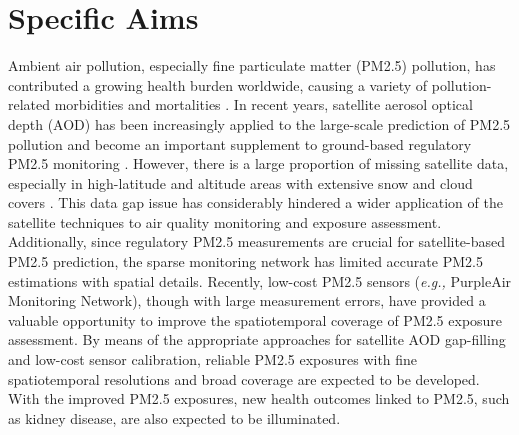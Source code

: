 \documentclass[11pt]{article}
\begin{document}
\section{Specific Aims}
Ambient air pollution, especially fine particulate matter (PM2.5) pollution, has contributed a growing health burden worldwide, causing a variety of pollution-related morbidities and mortalities \citep{Lelieveld2015}. In recent years, satellite aerosol optical depth (AOD) has been increasingly applied to the large-scale prediction of PM2.5 pollution and become an important supplement to ground-based regulatory PM2.5 monitoring \citep{Liu2005}. However, there is a large proportion of missing satellite data, especially in high-latitude and altitude areas with extensive snow and cloud covers \citep{Belle2017}. This data gap issue has considerably hindered a wider application of the satellite techniques to air quality monitoring and exposure assessment. Additionally, since regulatory PM2.5 measurements are crucial for satellite-based PM2.5 prediction, the sparse monitoring network has limited accurate PM2.5 estimations with spatial details. Recently, low-cost PM2.5 sensors (\textit{e.g.,} PurpleAir Monitoring Network), though with large measurement errors, have provided a valuable opportunity to improve the spatiotemporal coverage of PM2.5 exposure assessment. By means of the appropriate approaches for satellite AOD gap-filling and low-cost sensor calibration, reliable PM2.5 exposures with fine spatiotemporal resolutions and broad coverage are expected to be developed. With the improved PM2.5 exposures, new health outcomes linked to PM2.5, such as kidney disease, are also expected to be illuminated. 
\end{document}
